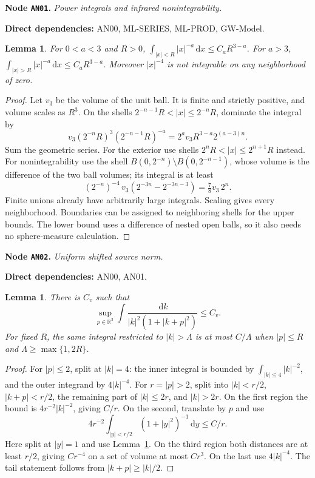 \documentclass[11pt,a4paper]{article}
\newtheorem{lemma}[theorem]{Lemma}
\theoremstyle{remark}\newtheorem{remark}[theorem]{Remark}
\newcommand{\R}{\mathbb R}\newcommand{\C}{\mathbb C}\newcommand{\N}{\mathbb N}
\newcommand{\abs}[1]{\lvert #1\rvert}\newcommand{\rankone}[2]{\lvert #1\rangle\langle #2\rvert}
\newcommand{\dd}{\,\mathrm d}\newcommand{\almosteverywhere}{\text{a.e.}}
\newcommand{\node}[3]{\par\Needspace{6\baselineskip}\smallskip\hypertarget{node:#1}{}\label{nodepage:#1}\noindent\textbf{Node \texttt{#1}.} \textit{#2.}\par\noindent\textbf{Direct dependencies:} #3.\par}
\begin{document}
\node{AN01}{Power integrals and infrared nonintegrability}{AN00, ML-SERIES, ML-PROD, GW-Model}
\begin{lemma}\label{lem:powers}
For $0<a<3$ and $R>0$, $\int_{\abs x<R}\abs x^{-a}\dd x\leq C_aR^{3-a}$. For $a>3$, $\int_{\abs x>R}\abs x^{-a}\dd x\leq C_aR^{3-a}$. Moreover $\abs x^{-4}$ is not integrable on any neighborhood of zero.
\end{lemma}
\begin{proof}
Let $v_3$ be the volume of the unit ball. It is finite and strictly positive, and volume scales as $R^3$. On the shells $2^{-n-1}R<\abs x\leq2^{-n}R$, dominate the integral by
\[
 v_3(2^{-n}R)^3(2^{-n-1}R)^{-a}
 =2^av_3R^{3-a}2^{(a-3)n}.
\]
Sum the geometric series. For the exterior use shells $2^nR<\abs x\leq2^{n+1}R$ instead. For nonintegrability use the shell $B(0,2^{-n})\setminus B(0,2^{-n-1})$, whose volume is the difference of the two ball volumes; its integral is at least
\[
 (2^{-n})^{-4}\,v_3(2^{-3n}-2^{-3n-3})
 =\tfrac78v_3\,2^n.
\]
Finite unions already have arbitrarily large integrals. Scaling gives every neighborhood. Boundaries can be assigned to neighboring shells for the upper bounds. The lower bound uses a difference of nested open balls, so it also needs no sphere-measure calculation.
\end{proof}

\node{AN02}{Uniform shifted source norm}{AN00, AN01}
\begin{lemma}\label{lem:shiftedsource}
There is $C_v$ such that
\[
 \sup_{p\in\R^3}\int\frac{\dd k}{\abs k^2(1+\abs{k+p}^2)}\leq C_v.
\]
For fixed $R$, the same integral restricted to $\abs k>\Lambda$ is at most $C/\Lambda$ when $\abs p\leq R$ and $\Lambda\geq\max\{1,2R\}$.
\end{lemma}
\begin{proof}
For $\abs p\leq2$, split at $\abs k=4$: the inner integral is bounded by $\int_{\abs k\leq4}\abs k^{-2}$, and the outer integrand by $4\abs k^{-4}$. For $r=\abs p>2$, split into $\abs k<r/2$, $\abs{k+p}<r/2$, the remaining part of $\abs k\leq2r$, and $\abs k>2r$. On the first region the bound is $4r^{-2}\abs k^{-2}$, giving $C/r$. On the second, translate by $p$ and use
\[
 4r^{-2}\int_{\abs y<r/2}(1+\abs y^2)^{-1}\dd y\leq C/r.
\]
Here split at $\abs y=1$ and use Lemma~\ref{lem:powers}. On the third region both distances are at least $r/2$, giving $C r^{-4}$ on a set of volume at most $C r^3$. On the last use $4\abs k^{-4}$. The tail statement follows from $\abs{k+p}\geq\abs k/2$.
\end{proof}
\end{document}
